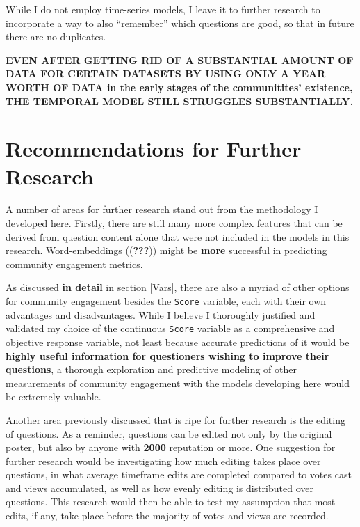 \documentclass[11pt,preprint, authoryear]{article}
\numberwithin{equation}{section}
\begin{document}
\normalsize

While I do not employ time-series models, I leave it to further research
to incorporate a way to also ``remember'' which questions are good, so
that in future there are no duplicates.

\textbf{EVEN AFTER GETTING RID OF A SUBSTANTIAL AMOUNT OF DATA FOR
CERTAIN DATASETS BY USING ONLY A YEAR WORTH OF DATA in the early stages
of the communitites' existence, THE TEMPORAL MODEL STILL STRUGGLES
SUBSTANTIALLY.}

\newpage

\section{\texorpdfstring{Recommendations for Further Research
\label{Recom}}{Recommendations for Further Research }}\label{recommendations-for-further-research}

A number of areas for further research stand out from the methodology I
developed here. Firstly, there are still many more complex features that
can be derived from question content alone that were not included in the
models in this research. Word-embeddings (({\textbf{???}})) might be
\textbf{more} successful in predicting community engagement metrics.

As discussed \textbf{in detail} in section \ref{Vars}, there are also a
myriad of other options for community engagement besides the
\texttt{Score} variable, each with their own advantages and
disadvantages. While I believe I thoroughly justified and validated my
choice of the continuous \texttt{Score} variable as a comprehensive and
objective response variable, not least because accurate predictions of
it would be \textbf{highly useful information for questioners wishing to
improve their questions}, a thorough exploration and predictive modeling
of other measurements of community engagement with the models developing
here would be extremely valuable.

Another area previously discussed that is ripe for further research is
the editing of questions. As a reminder, questions can be edited not
only by the original poster, but also by anyone with \textbf{2000}
reputation or more. One suggestion for further research would be
investigating how much editing takes place over questions, in what
average timeframe edits are completed compared to votes cast and views
accumulated, as well as how evenly editing is distributed over
questions. This research would then be able to test my assumption that
most edits, if any, take place before the majority of votes and views
are recorded.
\end{document}
